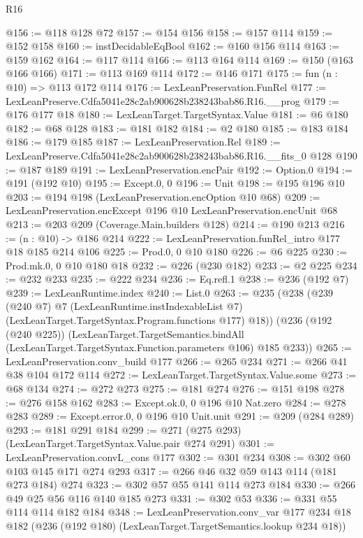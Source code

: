 \begin{lexlean}{R16}
\begin{coremodule}
@156 := @118 @128 @72
@157 := @154 @156
@158 := @157 @114
@159 := @152 @158
@160 := instDecidableEqBool
@162 := @160 @156 @114
@163 := @159 @162
@164 := @117 @114
@166 := @113 @164 @114
@169 := @150 (@163 @166 @166)
@171 := @113 @169 @114
@172 := @146 @171
@175 := fun (n : @10) => @113 @172 @114
@176 := LexLeanPreservation.FunRel
@177 := LexLeanPreserve.Cdfa5041e28c2ab900628b238243bab86.R16.__prog
@179 := @176 @177 @18
@180 := LexLeanTarget.TargetSyntax.Value
@181 := @6 @180
@182 := @68 @128
@183 := @181 @182
@184 := @2 @180
@185 := @183 @184
@186 := @179 @185
@187 := LexLeanPreservation.Rel
@189 := LexLeanPreserve.Cdfa5041e28c2ab900628b238243bab86.R16.__fits_0 @128
@190 := @187 @189
@191 := LexLeanPreservation.encPair
@192 := Option.{0}
@194 := @191 (@192 @10)
@195 := Except.{0, 0}
@196 := Unit
@198 := @195 @196 @10
@203 := @194 @198 (LexLeanPreservation.encOption @10 @68)
@209 := LexLeanPreservation.encExcept @196 @10 LexLeanPreservation.encUnit @68
@213 := @203 @209 (Coverage.Main.builders @128)
@214 := @190 @213
@216 := (n : @10) -> @186 @214
@222 := LexLeanPreservation.funRel_intro @177 @18 @185 @214 @106
@225 := Prod.{0, 0} @10 @180
@226 := @6 @225
@230 := Prod.mk.{0, 0} @10 @180 @18
@232 := @226 (@230 @182)
@233 := @2 @225
@234 := @232 @233
@235 := @222 @234
@236 := Eq.refl.{1}
@238 := @236 (@192 @7)
@239 := LexLeanRuntime.index
@240 := List.{0}
@263 := @235
    (@238
      (@239
        (@240 @7)
        @7
        (LexLeanRuntime.instIndexableList @7)
        (LexLeanTarget.TargetSyntax.Program.functions @177)
        @18))
    (@236
      (@192 (@240 @225))
      (LexLeanTarget.TargetSemantics.bindAll
        (LexLeanTarget.TargetSyntax.Function.parameters @106)
        @185
        @233))
@265 := LexLeanPreservation.conv_build @177
@266 := @265 @234
@271 := @266 @41 @38 @104 @172 @114
@272 := LexLeanTarget.TargetSyntax.Value.some
@273 := @68 @134
@274 := @272 @273
@275 := @181 @274
@276 := @151 @198
@278 := @276 @158 @162
@283 := Except.ok.{0, 0} @196 @10 Nat.zero
@284 := @278 @283
@289 := Except.error.{0, 0} @196 @10 Unit.unit
@291 := @209 (@284 @289)
@293 := @181 @291 @184
@299 := @271 (@275 @293) (LexLeanTarget.TargetSyntax.Value.pair @274 @291)
@301 := LexLeanPreservation.convL_cons @177
@302 := @301 @234
@308 := @302 @60 @103 @145 @171 @274 @293
@317 := @266 @46 @32 @59 @143 @114 (@181 @273 @184) @274
@323 := @302 @57 @55 @141 @114 @273 @184
@330 := @266 @49 @25 @56 @116 @140 @185 @273
@331 := @302 @53
@336 := @331 @55 @114 @114 @182 @184
@348 := LexLeanPreservation.conv_var
    @177
    @234
    @18
    @182
    (@236 (@192 @180) (LexLeanTarget.TargetSemantics.lookup @234 @18))

\end{coremodule}
\end{lexlean}
